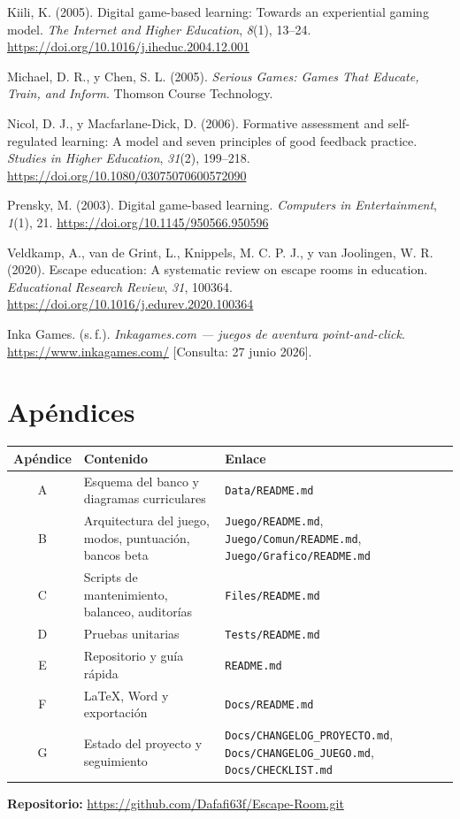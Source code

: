 \documentclass[11pt,a4paper]{article}
\newcommand{\tfgrepo}{\url{https://github.com/Dafafi63f/Escape-Room.git}}
\begin{document}
Kiili, K. (2005). Digital game-based learning: Towards an experiential gaming model. \textit{The Internet and Higher Education}, \textit{8}(1), 13--24. \url{https://doi.org/10.1016/j.iheduc.2004.12.001}

Michael, D. R., y Chen, S. L. (2005). \textit{Serious Games: Games That Educate, Train, and Inform}. Thomson Course Technology.

Nicol, D. J., y Macfarlane-Dick, D. (2006). Formative assessment and self-regulated learning: A model and seven principles of good feedback practice. \textit{Studies in Higher Education}, \textit{31}(2), 199--218. \url{https://doi.org/10.1080/03075070600572090}

Prensky, M. (2003). Digital game-based learning. \textit{Computers in Entertainment}, \textit{1}(1), 21. \url{https://doi.org/10.1145/950566.950596}

Veldkamp, A., van de Grint, L., Knippels, M. C. P. J., y van Joolingen, W. R. (2020). Escape education: A systematic review on escape rooms in education. \textit{Educational Research Review}, \textit{31}, 100364. \url{https://doi.org/10.1016/j.edurev.2020.100364}

Inka Games. (s.\,f.). \textit{Inkagames.com --- juegos de aventura point-and-click}. \url{https://www.inkagames.com/} [Consulta: 27 junio 2026].

\section{Apéndices}
\renewcommand{\arraystretch}{1.08}
\begin{tabularx}{\textwidth}{@{}c>{\raggedright\arraybackslash}X>{\raggedright\arraybackslash}p{4.2cm}@{}}
\toprule
\textbf{Apéndice} & \textbf{Contenido} & \textbf{Enlace} \\
\midrule
A & Esquema del banco y diagramas curriculares & \texttt{Data/README.md} \\
B & Arquitectura del juego, modos, puntuación, bancos beta & \texttt{Juego/README.md}, \texttt{Juego/Comun/README.md}, \texttt{Juego/Grafico/README.md} \\
C & Scripts de mantenimiento, balanceo, auditorías & \texttt{Files/README.md} \\
D & Pruebas unitarias & \texttt{Tests/README.md} \\
E & Repositorio y guía rápida & \texttt{README.md} \\
F & LaTeX, Word y exportación & \texttt{Docs/README.md} \\
G & Estado del proyecto y seguimiento & \texttt{Docs/CHANGELOG\_PROYECTO.md}, \texttt{Docs/CHANGELOG\_JUEGO.md}, \texttt{Docs/CHECKLIST.md} \\
\bottomrule
\end{tabularx}

\medskip
\noindent\textbf{Repositorio:} \tfgrepo
\end{document}
